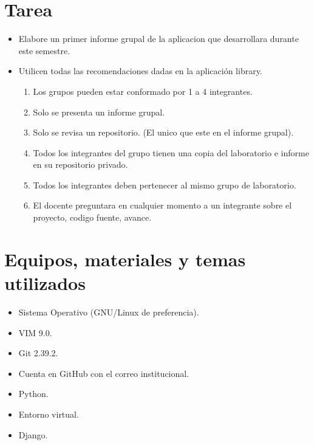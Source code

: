 \documentclass{article}
\begin{document}
	\section{Tarea}
	\begin{itemize}
		\item Elabore un primer informe grupal de la aplicacion que desarrollara durante este semestre.
        \item Utilicen todas las recomendaciones dadas en la aplicación library.
        \begin{enumerate}
        \item Los grupos pueden estar conformado por 1 a 4 integrantes.
        \item Solo se presenta un informe grupal.
        \item Solo se revisa un repositorio. (El unico que este en el informe grupal).
        \item Todos los integrantes del grupo tienen una copia del laboratorio e informe en su repositorio privado.
        \item Todos los integrantes deben pertenecer al mismo grupo de laboratorio.
        \item El docente preguntara en cualquier momento a un integrante sobre el proyecto, codigo fuente, avance.
        \end{enumerate}
	\end{itemize}
 
\newpage
	\section{Equipos, materiales y temas utilizados}
	\begin{itemize}
		\item Sistema Operativo (GNU/Linux de preferencia).
		\item VIM 9.0.
		\item Git 2.39.2.
		\item Cuenta en GitHub con el correo institucional.
		\item Python.
		\item Entorno virtual.
        \item Django.
	\end{itemize}
 
\end{document}
